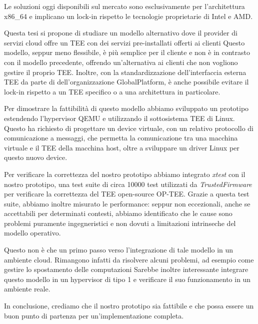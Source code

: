 \documentclass[12pt,italian]{report}
\begin{document}
Le soluzioni oggi disponibili sul mercato sono esclusivamente per
l'architettura x86\_64 e implicano un lock-in rispetto le tecnologie
proprietarie di Intel e AMD.

Questa tesi si propone di studiare un modello alternativo dove il provider
di servizi cloud offre un TEE con dei servizi pre-installati offerti ai
clienti
Questo modello, seppur meno flessibile, è più semplice per il cliente e non
è in contrasto con il modello precedente, offrendo un'alternativa
ai clienti che non vogliono gestire il proprio TEE.
Inoltre, con la standardizzazione dell'interfaccia esterna TEE da parte di
dell'organizzazione GlobalPlatform, è anche possibile evitare il lock-in
rispetto a un TEE specifico o a una architettura in particolare.

Per dimostrare la fattibilità di questo modello abbiamo sviluppato un
prototipo estendendo l'hypervisor QEMU e utilizzando il sottosistema
TEE di Linux.
Questo ha richiesto di progettare un device virtuale, con un relativo protocollo
di comunicazione a messaggi, che permetta la comunicazione tra una macchina
virtuale e il TEE della macchina host, oltre a sviluppare un driver Linux
per questo nuovo device.

Per verificare la correttezza del nostro prototipo abbiamo integrato
\textit{xtest} con il nostro prototipo, una test suite di circa 10000 test
utilizzati da \textit{TrustedFirmware} per verificare la correttezza del
TEE open-source OP-TEE.
Grazie a questa test suite, abbiamo inoltre misurato le performance: 
seppur non eccezionali, anche se accettabili per determinati contesti,
abbiamo identificato che le cause sono problemi puramente ingegneristici e
non dovuti a limitazioni intrinseche del modello operativo.

Questo non è che un primo passo verso l'integrazione di tale modello in un
ambiente cloud.
Rimangono infatti da risolvere alcuni problemi, ad esempio come gestire
lo spostamento delle computazioni 
Sarebbe inoltre interessante integrare questo modello in un hypervisor di
tipo 1 e verificare il suo funzionamento in un ambiente reale. 

In conclusione, crediamo che il nostro prototipo sia fattibile e che possa
essere un buon punto di partenza per un'implementazione completa.




\end{document}
